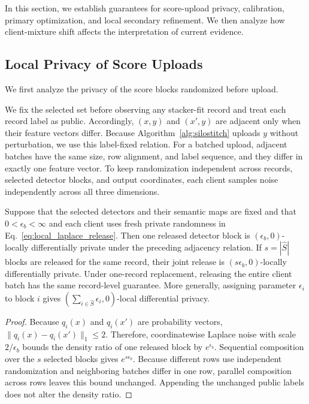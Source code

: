 In this section, we establish guarantees for score-upload privacy,
calibration, primary optimization, and local secondary refinement. We then
analyze how client-mixture shift affects the interpretation of current
evidence.

\subsection{Local Privacy of Score Uploads}

We first analyze the privacy of the score blocks randomized before upload.

We fix the selected set before observing any stacker-fit record and treat each
record label as public. Accordingly, $(x,y)$ and $(x',y)$ are adjacent only
when their feature vectors differ. Because Algorithm~\ref{alg:silostitch}
uploads $y$ without perturbation, we use this label-fixed relation. For a
batched upload, adjacent batches have the same size, row alignment, and label
sequence, and they differ in exactly one feature vector. To keep randomization
independent across records, selected detector blocks, and output coordinates,
each client samples noise independently across all three dimensions.

\begin{theorem}
\label{thm:local_score_privacy}
Suppose that the selected detectors and their semantic maps are fixed and
that $0<\epsilon_b<\infty$ and each client uses fresh private randomness in
Eq.~\ref{eq:local_laplace_release}. Then one released detector block is
$(\epsilon_b,0)$-locally differentially private under the preceding
adjacency relation. If $s=|\widehat S|$ blocks are released for the same
record, their joint release is $(s\epsilon_b,0)$-locally differentially
private. Under one-record replacement, releasing the entire client batch has
the same record-level guarantee. More generally, assigning parameter
$\epsilon_i$ to block $i$ gives
$(\sum_{i\in\widehat S}\epsilon_i,0)$-local differential privacy.
\end{theorem}

\begin{proof}
Because $q_i(x)$ and $q_i(x')$ are probability vectors,
$\lVert q_i(x)-q_i(x')\rVert_1\le2$. Therefore, coordinatewise Laplace noise
with scale $2/\epsilon_b$ bounds the density ratio of one released block by
$e^{\epsilon_b}$. Sequential composition over the $s$ selected blocks gives
$e^{s\epsilon_b}$. Because different rows use independent randomization and
neighboring batches differ in one row, parallel composition across rows leaves
this bound unchanged. Appending the unchanged public labels does not alter the
density ratio.
\end{proof}

